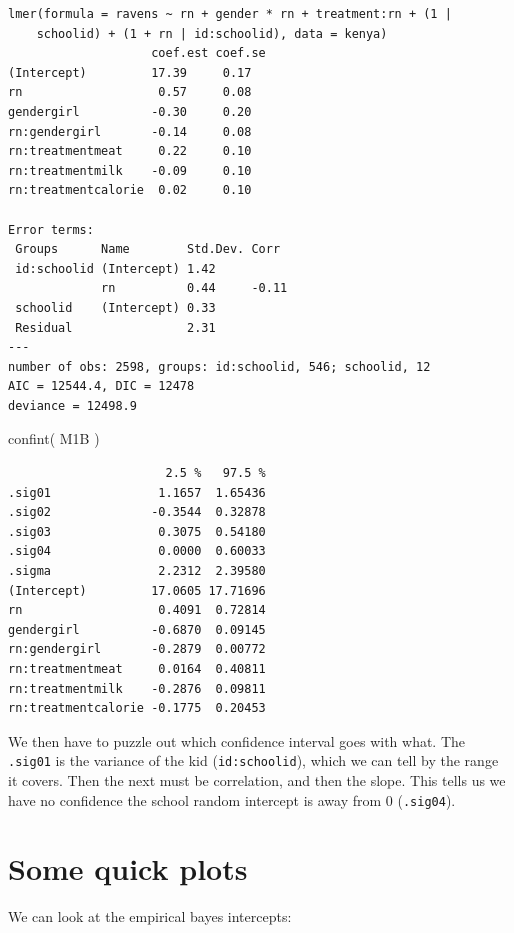 \documentclass[
  letterpaper,
  DIV=11,
  numbers=noendperiod]{scrreprt}
\newenvironment{Shaded}{\begin{snugshade}}{\end{snugshade}}
\newcommand{\FunctionTok}[1]{\textcolor[rgb]{0.02,0.16,0.49}{#1}}
\newcommand{\NormalTok}[1]{\textcolor[rgb]{0.00,0.44,0.13}{#1}}
\begin{document}
\begin{verbatim}
lmer(formula = ravens ~ rn + gender * rn + treatment:rn + (1 | 
    schoolid) + (1 + rn | id:schoolid), data = kenya)
                    coef.est coef.se
(Intercept)         17.39     0.17  
rn                   0.57     0.08  
gendergirl          -0.30     0.20  
rn:gendergirl       -0.14     0.08  
rn:treatmentmeat     0.22     0.10  
rn:treatmentmilk    -0.09     0.10  
rn:treatmentcalorie  0.02     0.10  

Error terms:
 Groups      Name        Std.Dev. Corr  
 id:schoolid (Intercept) 1.42           
             rn          0.44     -0.11 
 schoolid    (Intercept) 0.33           
 Residual                2.31           
---
number of obs: 2598, groups: id:schoolid, 546; schoolid, 12
AIC = 12544.4, DIC = 12478
deviance = 12498.9 
\end{verbatim}

\begin{Shaded}
\begin{Highlighting}[]
\FunctionTok{confint}\NormalTok{( M1B )}
\end{Highlighting}
\end{Shaded}

\begin{verbatim}
                      2.5 %   97.5 %
.sig01               1.1657  1.65436
.sig02              -0.3544  0.32878
.sig03               0.3075  0.54180
.sig04               0.0000  0.60033
.sigma               2.2312  2.39580
(Intercept)         17.0605 17.71696
rn                   0.4091  0.72814
gendergirl          -0.6870  0.09145
rn:gendergirl       -0.2879  0.00772
rn:treatmentmeat     0.0164  0.40811
rn:treatmentmilk    -0.2876  0.09811
rn:treatmentcalorie -0.1775  0.20453
\end{verbatim}

We then have to puzzle out which confidence interval goes with what. The
\texttt{.sig01} is the variance of the kid (\texttt{id:schoolid}), which
we can tell by the range it covers. Then the next must be correlation,
and then the slope. This tells us we have no confidence the school
random intercept is away from 0 (\texttt{.sig04}).

\hypertarget{some-quick-plots}{%
\section{Some quick plots}\label{some-quick-plots}}

We can look at the empirical bayes intercepts:
\end{document}
